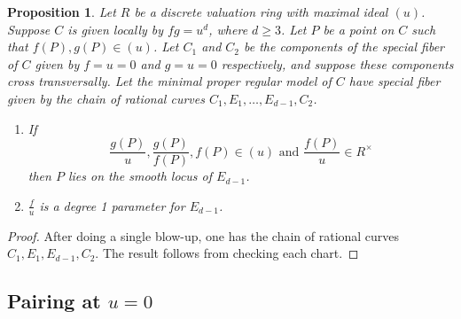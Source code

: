 \documentclass[reqno]{amsart}
\newtheorem{proposition}[thm]{Proposition}
\theoremstyle{definition}
\theoremstyle{remark}
\begin{document}
\begin{proposition}\label{prop:fg-equals-u-blow-up}
  Let $R$ be a discrete valuation ring with maximal ideal $(u)$. Suppose $C$ is given locally by $fg = u^d$, where $d \geq 3$. Let $P$ be a point on $C$ such that $f(P), g(P) \in (u)$. Let $C_1$ and $C_2$ be the components of the special fiber of $C$ given by $f = u = 0$ and $g = u = 0$ respectively, and suppose these components cross transversally. Let the minimal proper regular model of $C$ have special fiber given by the chain of rational curves $C_1, E_1, \dots, E_{d-1}, C_2$.
  \begin{enumerate}
      \item  If
  \[
  \frac{g(P)}{u}, \frac{g(P)}{f(P)}, f(P) \in (u) \text{ and } \frac{f(P)}{u} \in R^\times
  \]
  then $P$ lies on the smooth locus of $E_{d-1}$.
    \item $\frac{f}{u}$ is a degree 1 parameter for $E_{d-1}$.
  \end{enumerate}
\end{proposition}

\begin{proof}
  After doing a single blow-up, one has the chain of rational curves $C_1, E_1, E_{d-1}, C_2$. The result follows from checking each chart.
\end{proof}

\subsection{Pairing at $u = 0$}
\label{sec:pairing-at-u}
\end{document}

